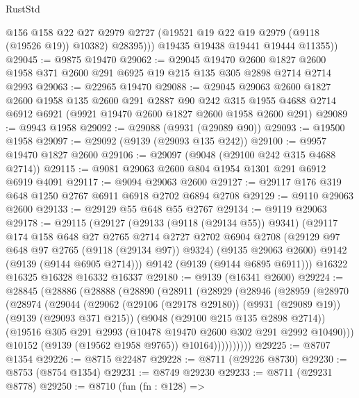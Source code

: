 \begin{lexlean}{RustStd}
\begin{coremodule}
              @156
              @158
              @22
              @27
              @2979
              @2727
              (@19521 @19 @22 @19 @2979 (@9118 (@19526 @19)) @10382)
              @28395)))
        @19435
        @19438
        @19441
        @19444
        @11355))
@29045 := @9875 @19470
@29062 := @29045
    @19470
    @2600
    @1827
    @2600
    @1958
    @371
    @2600
    @291
    @6925
    @19
    @215
    @135
    @305
    @2898
    @2714
    @2714
    @2993
@29063 := @22965 @19470
@29088 := @29045
    @29063
    @2600
    @1827
    @2600
    @1958
    @135
    @2600
    @291
    @2887
    @90
    @242
    @315
    @1955
    @4688
    @2714
    @6912
    @6921
    (@9921 @19470 @2600 @1827 @2600 @1958 @2600 @291)
@29089 := @9943 @1958
@29092 := @29088 (@9931 (@29089 @90))
@29093 := @19500 @1958
@29097 := @29092 (@9139 (@29093 @135 @242))
@29100 := @9957 @19470 @1827 @2600
@29106 := @29097 (@9048 (@29100 @242 @315 @4688 @2714))
@29115 := @9081 @29063 @2600 @804 @1954 @1301 @291 @6912 @6919 @4091
@29117 := @9094 @29063 @2600
@29127 := @29117 @176 @319 @648 @1250 @2767 @6911 @6918 @2702 @6894 @2708
@29129 := @9110 @29063 @2600
@29133 := @29129 @55 @648 @55 @2767
@29134 := @9119 @29063
@29178 := @29115
    (@29127
      (@29133 (@9118 (@29134 @55)) @9341)
      (@29117
        @174
        @158
        @648
        @27
        @2765
        @2714
        @2727
        @2702
        @6904
        @2708
        (@29129 @97 @648 @97 @2765 (@9118 (@29134 @97)) @9324)
        (@9135 @29063 @2600)
        @9142
        (@9139 (@9144 @6905 @2714)))
      @9142
      (@9139 (@9144 @6895 @6911)))
    @16322
    @16325
    @16328
    @16332
    @16337
@29180 := @9139 (@16341 @2600)
@29224 := @28845
    (@28886
      (@28888
        (@28890
          (@28911
            (@28929
              (@28946
                (@28959
                  (@28970
                    (@28974
                      (@29044
                        (@29062
                          (@29106 (@29178 @29180))
                          (@9931 (@29089 @19))
                          (@9139 (@29093 @371 @215))
                          (@9048 (@29100 @215 @135 @2898 @2714))
                          (@19516 @305 @291 @2993 (@10478 @19470 @2600 @302 @291 @2992 @10490)))
                        @10152
                        (@9139 (@19562 @1958 @9765))
                        @10164))))))))))
@29225 := @8707 @1354
@29226 := @8715 @22487
@29228 := @8711 (@29226 @8730)
@29230 := @8753 (@8754 @1354)
@29231 := @8749 @29230
@29233 := @8711 (@29231 @8778)
@29250 := @8710
    (fun (fn : @128) =>

\end{coremodule}
\end{lexlean}
